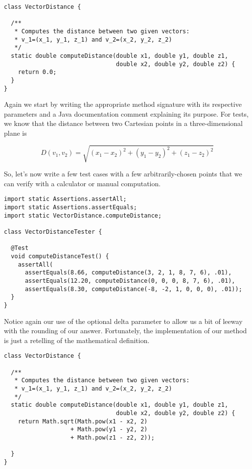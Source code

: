 \begin{cl}[]{}
\begin{lstlisting}[language=MyJava]
class VectorDistance {

  /**
   * Computes the distance between two given vectors:
   * v_1=(x_1, y_1, z_1) and v_2=(x_2, y_2, z_2)
   */
  static double computeDistance(double x1, double y1, double z1, 
                                double x2, double y2, double z2) {
    return 0.0;
  }
}
\end{lstlisting}
\end{cl}

Again we start by writing the appropriate method signature with its respective parameters and a Java documentation comment explaining its purpose. For tests, we know that the distance between two Cartesian points in a three-dimensional plane is 

\[
D(v_1, v_2) = \sqrt{(x_1 - x_2)^2 + (y_1 - y_2)^2 + (z_1 - z_2)^2}
\]

So, let's now write a few test cases with a few arbitrarily-chosen points that we can verify with a calculator or manual computation.

\begin{cl}[]{}
\begin{lstlisting}[language=MyJava]
import static Assertions.assertAll;
import static Assertions.assertEquals;
import static VectorDistance.computeDistance;

class VectorDistanceTester {

  @Test
  void computeDistanceTest() {
    assertAll(
      assertEquals(8.66, computeDistance(3, 2, 1, 8, 7, 6), .01),
      assertEquals(12.20, computeDistance(0, 0, 0, 8, 7, 6), .01),
      assertEquals(8.30, computeDistance(-8, -2, 1, 0, 0, 0), .01));
  }
}
\end{lstlisting}
\end{cl}

Notice again our use of the optional delta parameter to allow us a bit of leeway with the rounding of our answer. Fortunately, the implementation of our method is just a retelling of the mathematical definition.

\begin{cl}{}
\begin{lstlisting}[language=MyJava]
class VectorDistance {

  /**
   * Computes the distance between two given vectors:
   * v_1=(x_1, y_1, z_1) and v_2=(x_2, y_2, z_2)
   */
  static double computeDistance(double x1, double y1, double z1, 
                                double x2, double y2, double z2) {
    return Math.sqrt(Math.pow(x1 - x2, 2) 
                   + Math.pow(y1 - y2, 2)
                   + Math.pow(z1 - z2, 2));
  
  }
}
\end{lstlisting}
\end{cl}

